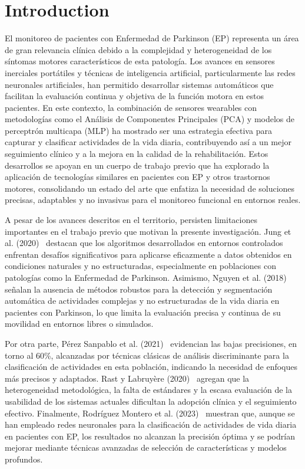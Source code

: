 \documentclass[journal]{IEEEtran}
\begin{document}
\section{Introduction}




El monitoreo de pacientes con Enfermedad de Parkinson (EP) representa un área de gran relevancia clínica debido a la complejidad y heterogeneidad de los síntomas motores característicos de esta patología. Los avances en sensores inerciales portátiles y técnicas de inteligencia artificial, particularmente las redes neuronales artificiales, han permitido desarrollar sistemas automáticos que facilitan la evaluación continua y objetiva de la función motora en estos pacientes. En este contexto, la combinación de sensores wearables con metodologías como el Análisis de Componentes Principales (PCA) y modelos de perceptrón multicapa (MLP) ha mostrado ser una estrategia efectiva para capturar y clasificar actividades de la vida diaria, contribuyendo así a un mejor seguimiento clínico y a la mejora en la calidad de la rehabilitación. Estos desarrollos se apoyan en un cuerpo de trabajo previo que ha explorado la aplicación de tecnologías similares en pacientes con EP y otros trastornos motores, consolidando un estado del arte que enfatiza la necesidad de soluciones precisas, adaptables y no invasivas para el monitoreo funcional en entornos reales.

A pesar de los avances descritos en el territorio, persisten limitaciones importantes en el trabajo previo que motivan la presente investigación. Jung et al. (2020)~\cite{Jung_2020} destacan que los algoritmos desarrollados en entornos controlados enfrentan desafíos significativos para aplicarse eficazmente a datos obtenidos en condiciones naturales y no estructuradas, especialmente en poblaciones con patologías como la Enfermedad de Parkinson. Asimismo, Nguyen et al. (2018)~\cite{Nguyen_2018} señalan la ausencia de métodos robustos para la detección y segmentación automática de actividades complejas y no estructuradas de la vida diaria en pacientes con Parkinson, lo que limita la evaluación precisa y continua de su movilidad en entornos libres o simulados.

Por otra parte, Pérez Sanpablo et al. (2021)~\cite{Sanpablo_2021} evidencian las bajas precisiones, en torno al 60\%, alcanzadas por técnicas clásicas de análisis discriminante para la clasificación de actividades en esta población, indicando la necesidad de enfoques más precisos y adaptados. Rast y Labruyère (2020)~\cite{Rast_2020} agregan que la heterogeneidad metodológica, la falta de estándares y la escasa evaluación de la usabilidad de los sistemas actuales dificultan la adopción clínica y el seguimiento efectivo. Finalmente, Rodríguez Montero et al. (2023)~\cite{Montero_2023} muestran que, aunque se han empleado redes neuronales para la clasificación de actividades de vida diaria en pacientes con EP, los resultados no alcanzan la precisión óptima y se podrían mejorar mediante técnicas avanzadas de selección de características y modelos profundos.
\end{document}

